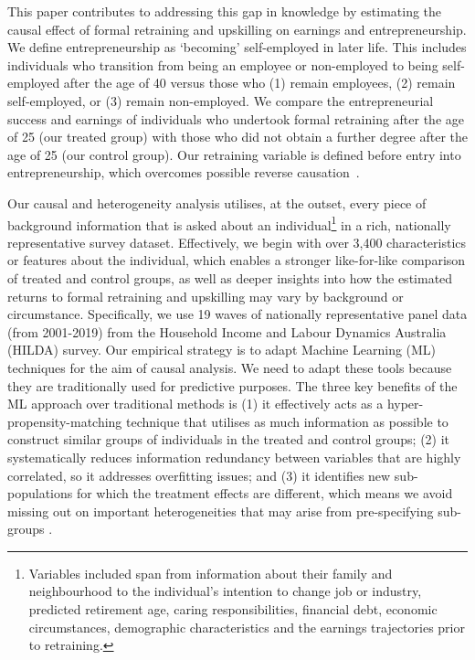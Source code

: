 \documentclass[12pt, a4paper]{article}
\begin{document}
This paper contributes to addressing this gap in knowledge by estimating the causal effect of formal retraining and upskilling on earnings and entrepreneurship. We define entrepreneurship as `becoming' self-employed in later life. This includes individuals who transition from being an employee or non-employed to being self-employed after the age of 40 versus those who (1) remain employees, (2) remain self-employed, or (3) remain non-employed. We compare the entrepreneurial success and earnings of individuals who undertook formal retraining after the age of 25 (our treated group) with those who did not obtain a further degree after the age of 25 (our control group). Our retraining variable is defined before entry into entrepreneurship, which overcomes possible reverse causation~\citep{cassar2006}. 

Our causal and heterogeneity analysis utilises, at the outset, every piece of background information that is asked about an individual\footnote{Variables included span from information about their family and neighbourhood to the individual's intention to change job or industry, predicted retirement age, caring responsibilities, financial debt, economic circumstances, demographic characteristics and the earnings trajectories prior to retraining.} in a rich, nationally representative survey dataset. Effectively, we begin with over 3,400 characteristics or features about the individual, which enables a stronger like-for-like comparison of treated and control groups, as well as deeper insights into how the estimated returns to formal retraining and upskilling may vary by background or circumstance. Specifically, we use 19 waves of nationally representative panel data (from 2001-2019) from the Household Income and Labour Dynamics Australia (HILDA) survey. Our empirical strategy is to adapt Machine Learning (ML) techniques for the aim of causal analysis. We need to adapt these tools because they are traditionally used for predictive purposes. The three key benefits of the ML approach over traditional methods is (1) it effectively acts as a hyper-propensity-matching technique that utilises as much information as possible to construct similar groups of individuals in the treated and control groups; (2) it systematically reduces information redundancy between variables that are highly correlated, so it addresses overfitting issues; and (3) it identifies new sub-populations for which the treatment effects are different, which means we avoid missing out on important heterogeneities that may arise from pre-specifying sub-groups \citep{athey2017, knaus2021}.
\end{document}
